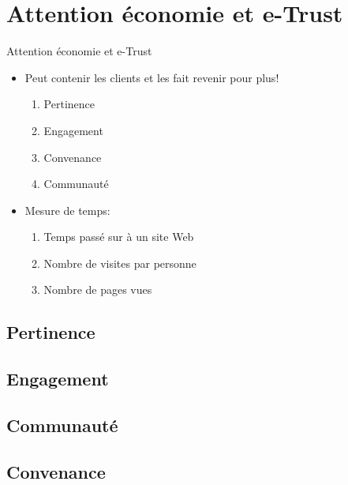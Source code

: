 \section[Attention économie et e-Trust]{Attention économie et e-Trust}

\begin{frame}
\end{frame}

\begin{frame}{Attention économie et e-Trust}
    \begin{itemize}\itemsep1em
        \item Peut contenir les clients et les fait revenir pour plus!
            \begin{enumerate}
                \item Pertinence
                \item Engagement
                \item Convenance
                \item Communauté
            \end{enumerate}
        \item Mesure de temps:
            \begin{enumerate}
                \item Temps passé sur à un site Web 
                \item Nombre de visites par personne 
                \item Nombre de pages vues
            \end{enumerate}
    \end{itemize}
\end{frame}

\subsection{Pertinence}
\begin{frame}
\end{frame}

\subsection{Engagement}
\begin{frame}
\end{frame}

\subsection{Communauté}
\begin{frame}
\end{frame}

\subsection{Convenance}
\begin{frame}
\end{frame}